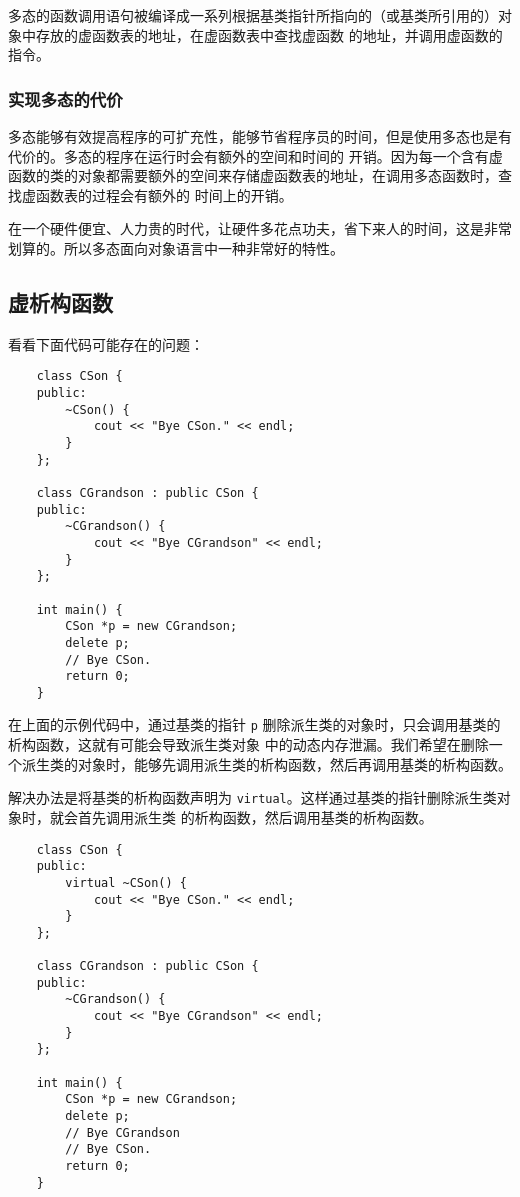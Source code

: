\documentclass[UTF8]{ctexart}
\begin{document}
多态的函数调用语句被编译成一系列根据基类指针所指向的（或基类所引用的）对象中存放的虚函数表的地址，在虚函数表中查找虚函数
的地址，并调用虚函数的指令。

\subsubsection{实现多态的代价}
多态能够有效提高程序的可扩充性，能够节省程序员的时间，但是使用多态也是有代价的。多态的程序在运行时会有额外的空间和时间的
开销。因为每一个含有虚函数的类的对象都需要额外的空间来存储虚函数表的地址，在调用多态函数时，查找虚函数表的过程会有额外的
时间上的开销。

在一个硬件便宜、人力贵的时代，让硬件多花点功夫，省下来人的时间，这是非常划算的。所以多态面向对象语言中一种非常好的特性。

\subsection{虚析构函数}
看看下面代码可能存在的问题：
\begin{verbatim}
    class CSon {
    public:
        ~CSon() {
            cout << "Bye CSon." << endl;
        }
    };

    class CGrandson : public CSon {
    public:
        ~CGrandson() {
            cout << "Bye CGrandson" << endl;
        }
    };

    int main() {
        CSon *p = new CGrandson;
        delete p;
        // Bye CSon.
        return 0;
    }
\end{verbatim}

在上面的示例代码中，通过基类的指针 \texttt{p} 删除派生类的对象时，只会调用基类的析构函数，这就有可能会导致派生类对象
中的动态内存泄漏。我们希望在删除一个派生类的对象时，能够先调用派生类的析构函数，然后再调用基类的析构函数。

解决办法是将基类的析构函数声明为 \texttt{virtual}。这样通过基类的指针删除派生类对象时，就会首先调用派生类
的析构函数，然后调用基类的析构函数。

\begin{verbatim}
    class CSon {
    public:
        virtual ~CSon() {
            cout << "Bye CSon." << endl;
        }
    };

    class CGrandson : public CSon {
    public:
        ~CGrandson() {
            cout << "Bye CGrandson" << endl;
        }
    };

    int main() {
        CSon *p = new CGrandson;
        delete p;
        // Bye CGrandson
        // Bye CSon.
        return 0;
    }
\end{verbatim}
\end{document}

